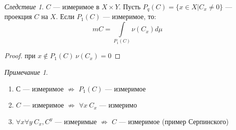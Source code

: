 \documentclass[english]{article}
\theoremstyle{plain}
\theoremstyle{remark}
\newtheorem*{remark}{Примечание}
\newtheorem{corollary}{Следствие}[theorem]
\theoremstyle{definition}
\begin{document}
\begin{corollary}
\(C\) --- измеримое в \(X\times Y\). Пусть \(P_q(C) = \{x \in X| C_x \neq 0\}\) --- проекция \(C\) на \(X\). Если \(P_1(C)\) --- измеримое, то:
\[ mC = \int\limits_{P_1(C)} \nu(C_x) d\mu \]
\end{corollary}
\begin{proof}
при \(x \not\in P_1(C)\ \nu(C_x) = 0\)
\end{proof}
\begin{remark}
\-
\begin{enumerate}
\item \(С\) --- измеримое \(\not\Rightarrow\) \(P_1(C)\) --- измеримое
\item \(C\) --- измеримое \(\not\Rightarrow\) \(\forall x\ C_x\) --- измеримо
\item \(\forall x\forall y\ C_x,C^y\) --- измеримые \(\not\Rightarrow\) \(C\) --- измеримое (пример Серпинского)
\end{enumerate}
\end{remark}
\end{document}
